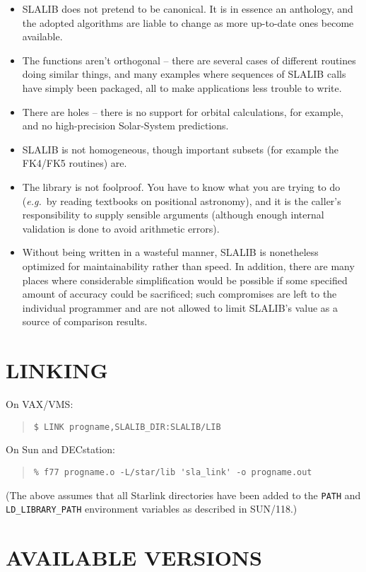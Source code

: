 \begin{itemize}
\item SLALIB does not pretend to be canonical.  It is in essence
an anthology, and the adopted algorithms are liable
to change as more up-to-date ones become available.
\item The functions aren't orthogonal -- there are several
cases of different
routines doing similar things, and many examples where
sequences of SLALIB calls have simply been packaged, all to
make applications less trouble to write.
\item There are holes -- there is no support for orbital calculations,
for example, and no high-precision Solar-System predictions.
\item SLALIB is not homogeneous, though important subsets
(for example the FK4/FK5 routines) are.
\item The library is not foolproof.  You have to know what
you are trying to do ({\it e.g.}\ by reading textbooks on positional
astronomy), and it is the caller's responsibility to supply
sensible arguments (although enough internal validation is done to
avoid arithmetic errors).
\item Without being written in a wasteful
manner, SLALIB is nonetheless optimized for maintainability
rather than speed.  In addition, there are many places
where considerable simplification would be possible if some
specified amount of accuracy could be sacrificed;  such
compromises are left to the individual programmer and
are not allowed to limit SLALIB's value as a source
of comparison results.
\end{itemize}

\section{LINKING}
On VAX/VMS:
\begin{verse}
\verb|$ LINK progname,SLALIB_DIR:SLALIB/LIB|
\end{verse}

On Sun and DECstation:
\begin{verse}
\verb|% f77 progname.o -L/star/lib 'sla_link' -o progname.out|
\end{verse}
(The above assumes that all Starlink directories have been added to
the \verb|PATH| and \verb|LD_LIBRARY_PATH| environment variables
as described in SUN/118.)

\section{AVAILABLE VERSIONS}

